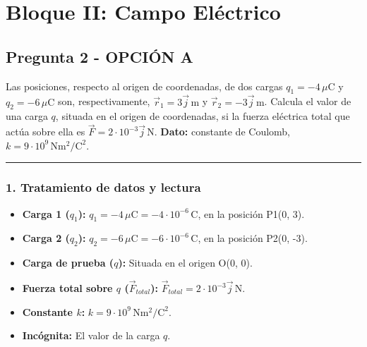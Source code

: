 \newpage

\section{Bloque II: Campo Eléctrico}
\label{sec:elec_2019_jul_ext}

\subsection{Pregunta 2 - OPCIÓN A}
\label{subsec:2A_2019_jul_ext}

\begin{cajaenunciado}
Las posiciones, respecto al origen de coordenadas, de dos cargas $q_1 = -4\,\mu\text{C}$ y $q_2 = -6\,\mu\text{C}$ son, respectivamente, $\vec{r}_1=3\vec{j}\,\text{m}$ y $\vec{r}_2=-3\vec{j}\,\text{m}$. Calcula el valor de una carga $q$, situada en el origen de coordenadas, si la fuerza eléctrica total que actúa sobre ella es $\vec{F}=2\cdot10^{-3}\vec{j}\,\text{N}$.
\textbf{Dato:} constante de Coulomb, $k=9\cdot10^9\,\text{N}\text{m}^2/\text{C}^2$.
\end{cajaenunciado}
\hrule

\subsubsection*{1. Tratamiento de datos y lectura}
\begin{itemize}
    \item \textbf{Carga 1 ($q_1$):} $q_1 = -4 \, \mu\text{C} = -4 \cdot 10^{-6} \, \text{C}$, en la posición P1(0, 3).
    \item \textbf{Carga 2 ($q_2$):} $q_2 = -6 \, \mu\text{C} = -6 \cdot 10^{-6} \, \text{C}$, en la posición P2(0, -3).
    \item \textbf{Carga de prueba ($q$):} Situada en el origen O(0, 0).
    \item \textbf{Fuerza total sobre $q$ ($\vec{F}_{total}$):} $\vec{F}_{total} = 2 \cdot 10^{-3}\vec{j} \, \text{N}$.
    \item \textbf{Constante $k$:} $k=9\cdot10^9\,\text{N}\text{m}^2/\text{C}^2$.
    \item \textbf{Incógnita:} El valor de la carga $q$.
\end{itemize}

